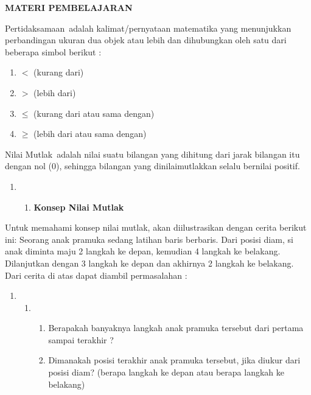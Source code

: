 \documentclass[11pt,fleqn]{book} %
\begin{document}
\noindent \textbf{MATERI PEMBELAJARAN}

\noindent Pertidaksamaan~adalah kalimat/pernyataan matematika yang menunjukkan perbandingan ukuran dua objek atau lebih dan dihubungkan oleh satu dari beberapa simbol berikut :

\begin{enumerate}
\item  $<$ (kurang dari)

\item  $>$ (lebih dari)

\item  $\mathrm{\le}$ (kurang dari atau sama dengan)

\item  $\mathrm{\ge}$ (lebih dari atau sama dengan)
\end{enumerate}

\noindent Nilai Mutlak~adalah nilai suatu bilangan yang dihitung dari jarak bilangan itu dengan nol (0), sehingga bilangan yang dinilaimutlakkan selalu bernilai positif.\textbf{}

\begin{enumerate}
\item \begin{enumerate}
\item \textbf{ Konsep Nilai Mutlak}
\end{enumerate}
\end{enumerate}

\noindent Untuk memahami konsep nilai mutlak, akan diilustrasikan dengan cerita berikut ini: Seorang anak pramuka sedang latihan baris berbaris. Dari posisi diam, si anak diminta maju 2 langkah ke depan, kemudian 4 langkah ke belakang. Dilanjutkan dengan 3 langkah ke depan dan akhirnya 2 langkah ke belakang. Dari cerita di atas dapat diambil permasalahan :

\begin{enumerate}
\item \begin{enumerate}
\item \begin{enumerate}
\item  Berapakah banyaknya langkah anak pramuka tersebut dari pertama sampai terakhir ?

\item  Dimanakah posisi terakhir anak pramuka tersebut, jika diukur dari posisi diam? (berapa langkah ke depan atau berapa langkah ke belakang) 
\end{enumerate}
\end{enumerate}
\end{enumerate}
\end{document}
